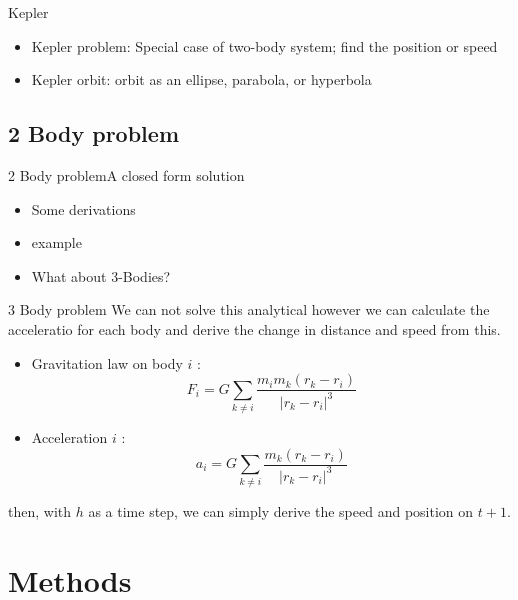 \documentclass{beamer}
\begin{document}
\begin{frame}{Kepler}
	\begin{itemize}
		\item 
			Kepler problem: Special case of two-body system; find the position or speed
		\item
			Kepler orbit: orbit as an ellipse, parabola, or hyperbola
	\end{itemize}
\end{frame}

\subsection{2 Body problem}

\begin{frame}{2 Body problem}{A closed form solution}

  \begin{itemize}
  \item
    Some derivations
  \item
    example
  \item
  	What about 3-Bodies?
  \end{itemize}
\end{frame}

\begin{frame}{3 Body problem}
	We can not solve this analytical however we can calculate the acceleratio for each body and derive the change in distance and speed from this.
  \begin{itemize}
    \item 
      Gravitation law on body $i$ : \begin{equation} F_i =G \sum_{k \neq i} \frac{m_im_k(r_k - r_i)}{|r_k - r_i|^3}\end{equation}
    \item 
      Acceleration $i$ : \begin{equation} a_i = G \sum_{k \neq i} \frac{m_k(r_k - r_i)}{|r_k - r_i|^3}\end{equation}
  \end{itemize}
  then, with $h$ as a time step, we can simply derive the speed and position on $t+1$.
  
\end{frame}

\section{Methods}
\end{document}
